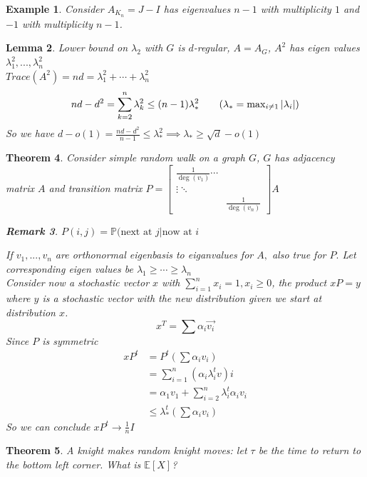 \documentclass[a4paper]{article}
\newtheorem{thm}{Theorem}[section]
\newtheorem{lem}[thm]{Lemma}
\newtheorem{eg}[thm]{Example}
\newtheorem{rmk}[thm]{Remark}
\begin{document}
\begin{eg}
    Consider $A_{K_n}=J-I$ has eigenvalues $n-1$ with multiplicity $1$ and $-1$ with multiplicity $n-1$.
\end{eg}
\begin{lem}
    Lower bound on $\lambda_2$ with $G$ is $d$-regular, $A=A_G$, $A^2$ has eigen values $\lambda_1^2,...,\lambda_n^2$\\
    $Trace(A^2)=nd=\lambda_1^2+\cdots+\lambda_n^2$\\
    \begin{align*}
        nd-d^2=\sum_{k=2}^n\lambda_k^2\leq (n-1)\lambda_*^2 \tag{$\lambda_*=\max_{i\neq 1}|\lambda_i|$}
    \end{align*}
    So we have $d-o(1)=\frac{nd-d^2}{n-1}\leq \lambda_*^2\implies \lambda_*\geq \sqrt{d}-o(1)$
\end{lem}
\begin{thm}
    Consider simple random walk on a graph $G$, $G$ has adjacency matrix $A$ and transition matrix $P=\begin{bmatrix}
        \frac{1}{\deg(v_1)} \cdots \\ \vdots \ddots \\ &\frac{1}{\deg(v_n)} 
    \end{bmatrix}A$\\
    \begin{rmk}
        $P(i,j)=\mathbb{P}(\text{next at $j$} | \text{now at $i$}$
    \end{rmk}
    \noindent If $v_1,...,v_n$ are orthonormal eigenbasis to eiganvalues for $A,$ also true for $P.$ Let corresponding eigen values be $\lambda_1\geq \cdots \geq \lambda_n$ \\
    Consider now a stochastic vector $x$ with $\sum_{i=1}^nx_i=1,x_i\geq 0$, the product $xP=y$ where $y$ is a stochastic vector with the new distribution given we start at distribution $x$. $$x^T=\sum\alpha_i\vec{v_i}$$
    Since $P$ is symmetric 
    \begin{align}
        xP^t&=P^t(\sum\alpha_iv_i)\\
        &=\sum_{i=1}^n(\alpha_i\lambda_i^tv)i\\
        &=\alpha_1v_1+\sum_{i=2}^n\lambda_i^t\alpha_iv_i\\
        &\leq \lambda_*^t\left (\sum\alpha_iv_i\right )
    \end{align}
    So we can conclude $xP^t\to \frac{1}{n}I$
\end{thm}
\begin{thm}
    A knight makes random knight moves: let $\tau$ be the time to return to the bottom left corner. What is $\mathbb{E}[X]$?
\end{thm}
\end{document}
